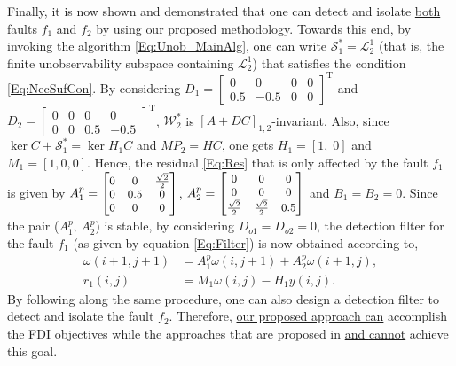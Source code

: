 \documentclass[journal,12pt,draftcls,onecolumn]{IEEEtran}
\newcommand{\tran}{\mathrm{T}}
\newcommand{\bbm}{\begin{bmatrix}}
\newcommand{\ebm}{\end{bmatrix}}
\newcommand{\bs}{\begin{small}}
\newcommand{\es}{\end{small}}
\newcommand{\ssp}[1]{\mathscr{#1}}      \newcommand{\setssp}[1]{\mathfrak{#1}}   \newcommand{\fld}[1]{\mathbb{#1}}       \newcommand{\op}[1]{\mathcal{#1}}       \newcommand{\sumbanach}[1]{\sum{#1}}
\begin{document}
Finally, it is now shown and demonstrated that one can detect and isolate \underline{both} faults $f_1$ and $f_2$ by using \underline{our proposed} methodology. Towards this end, by invoking the algorithm \eqref{Eq:Unob_MainAlg}, one can write $\op{S}_1^* = \ssp{L}_2^1$ (that is, the finite unobservability subspace containing $\ssp{L}_2^1$) that satisfies the condition \eqref{Eq:NecSufCon}. By considering $D_1=\bbm 0 &0 &0 &0\\ 0.5 &-0.5 &0 &0\ebm^\tran$ and $D_2=\bbm 0 &0 &0 &0\\ 0 &0 &0.5 &-0.5\ebm^\tran$, $\ssp{W}^*_2$ is $[A+DC]_{1,2}$-invariant. Also, since  $\ker C+\op{S}_1^* = \ker H_1C$ and $MP_2=HC$, one gets $H_1=[1,\;0]$ and $M_1=[1,0,0]$. Hence, the residual \eqref{Eq:Res} that is only affected by the fault $f_1$ is given by $A_1^p = \bs\bbm 0 &0 &\frac{\sqrt{2}}{2}\\ 0 &0.5 &0\\ 0 &0 &0\ebm\es$, $A_2^p = \bs\bbm  0 &0 &0\\  0 &0 &0\\ \frac{\sqrt{2}}{2} &\frac{\sqrt{2}}{2} &0.5 \ebm\es$ and $B_1=B_2=0$.
Since the pair ($A_1^p$, $A_2^p$) is stable, by considering $D_{o1}=D_{o2}=0$, the detection filter for the fault $f_1$ (as given by equation \eqref{Eq:Filter}) is now obtained according to,
\begin{equation}
	\begin{split}
		\omega(i+1,j+1)&=A_1^p\omega(i,j+1)+ A_2^p\omega(i+1,j),\\
		r_1(i,j)&=M_1\omega(i,j)-H_1y(i,j).
	\end{split}
\end{equation}
By following along the same procedure, one can also design a detection filter to detect and isolate the fault $f_2$. Therefore, \underline{our proposed approach can} accomplish the FDI objectives while the approaches that are proposed in \underline{\cite{BisiaccoMultiDim, BisiaccoLetter} and \cite{Malek_3DFDI} cannot} achieve this goal.
\end{document}
